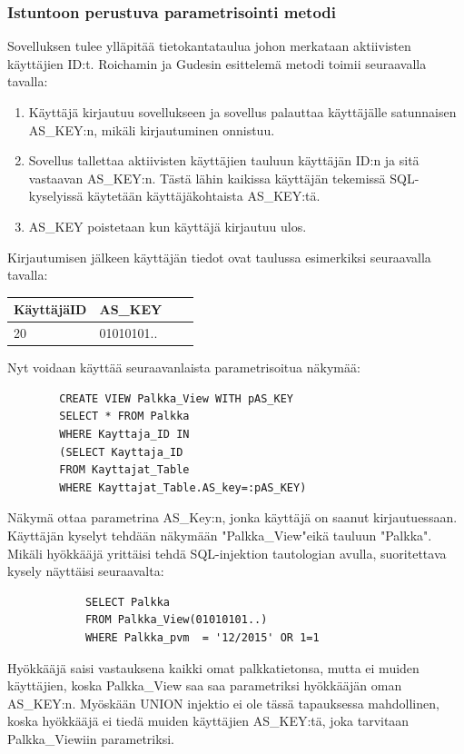 \documentclass[finnish]{tktltiki2}
\theoremstyle{definition}
\theoremstyle{remark}
\begin{document}
		\subsubsection {Istuntoon perustuva parametrisointi metodi}
		Sovelluksen tulee ylläpitää tietokantataulua johon merkataan aktiivisten käyttäjien ID:t. Roichamin ja Gudesin esittelemä metodi toimii seuraavalla tavalla:
		\begin{enumerate}
			\item Käyttäjä kirjautuu sovellukseen ja sovellus palauttaa käyttäjälle satunnaisen AS\_KEY:n, mikäli kirjautuminen onnistuu.
			
			\item Sovellus tallettaa aktiivisten käyttäjien tauluun käyttäjän ID:n ja sitä vastaavan AS\_KEY:n. Tästä lähin kaikissa käyttäjän tekemissä SQL-kyselyissä käytetään käyttäjäkohtaista AS\_KEY:tä.
			
			\item AS\_KEY poistetaan kun käyttäjä kirjautuu ulos.
		\end{enumerate}
		
		Kirjautumisen jälkeen käyttäjän tiedot ovat taulussa esimerkiksi seuraavalla tavalla:
	
		\begin{center}
		\begin{tabular}{| l | l | l | l |}
			\hline
			KäyttäjäID & AS\_KEY \\ \hline
			\hline
			20 &  01010101.. \\
			\hline
		\end{tabular}
		\end{center}
	

		Nyt voidaan käyttää seuraavanlaista parametrisoitua näkymää:
		\begin{lstlisting}
		CREATE VIEW Palkka_View WITH pAS_KEY
		SELECT * FROM Palkka
		WHERE Kayttaja_ID IN
		(SELECT Kayttaja_ID
		FROM Kayttajat_Table
		WHERE Kayttajat_Table.AS_key=:pAS_KEY) 
		\end{lstlisting}
		Näkymä ottaa parametrina AS\_Key:n, jonka käyttäjä on saanut kirjautuessaan. Käyttäjän kyselyt tehdään näkymään "Palkka\_View"\space eikä tauluun "Palkka". Mikäli hyökkääjä yrittäisi tehdä SQL-injektion tautologian avulla, suoritettava kysely näyttäisi seuraavalta:
		\begin{lstlisting}
			SELECT Palkka
			FROM Palkka_View(01010101..) 
			WHERE Palkka_pvm  = '12/2015' OR 1=1
		\end{lstlisting}
		Hyökkääjä saisi vastauksena kaikki omat palkkatietonsa, mutta ei muiden käyttäjien, koska Palkka\_View saa saa parametriksi hyökkääjän oman AS\_KEY:n. Myöskään UNION injektio ei ole tässä tapauksessa mahdollinen, koska hyökkääjä ei tiedä muiden käyttäjien AS\_KEY:tä, joka tarvitaan Palkka\_Viewiin parametriksi.
	
\end{document}
